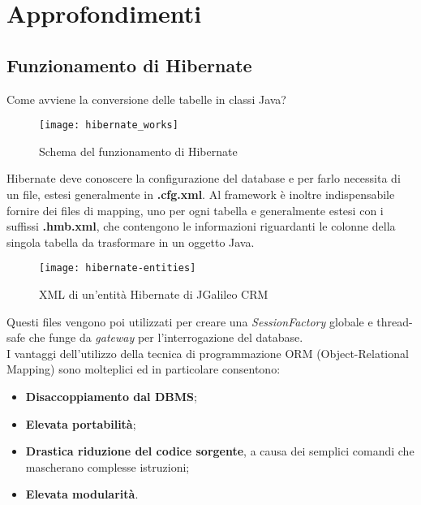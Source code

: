 \null\newpage
\chapter{Approfondimenti}

\section{Funzionamento di Hibernate} 
\label{sec:appendice-1}
Come avviene la conversione delle tabelle in classi Java?\\
\begin{figure}[h]
	\centering
	\texttt{[image: hibernate\_works]}
	\caption{Schema del funzionamento di Hibernate}
	\label{schema-generale-hibernate}
\end{figure}
Hibernate deve conoscere la configurazione del database e per farlo necessita di un file, estesi generalmente in \textbf{.cfg.xml}. Al framework è inoltre indispensabile fornire dei files di mapping, uno per ogni tabella e generalmente estesi con i suffissi \textbf{.hmb.xml}, che contengono le informazioni riguardanti le colonne della singola tabella da trasformare in un oggetto Java.\\

\begin{figure}[h]
	\centering
	\texttt{[image: hibernate-entities]}
	\caption{XML di un'entità Hibernate di JGalileo CRM}
	\label{entità}
\end{figure}

Questi files vengono poi utilizzati per creare una \emph{SessionFactory} globale e thread-safe che funge da \emph{gateway} per l'interrogazione del database. \\ I vantaggi dell'utilizzo della tecnica di programmazione ORM (Object-Relational Mapping) sono molteplici ed in particolare consentono:
\begin{itemize}
	\item \textbf{Disaccoppiamento dal DBMS};
	\item \textbf{Elevata portabilità};
	\item \textbf{Drastica riduzione del codice sorgente}, a causa dei semplici comandi che mascherano complesse istruzioni;
	\item \textbf{Elevata modularità}.
\end{itemize}

